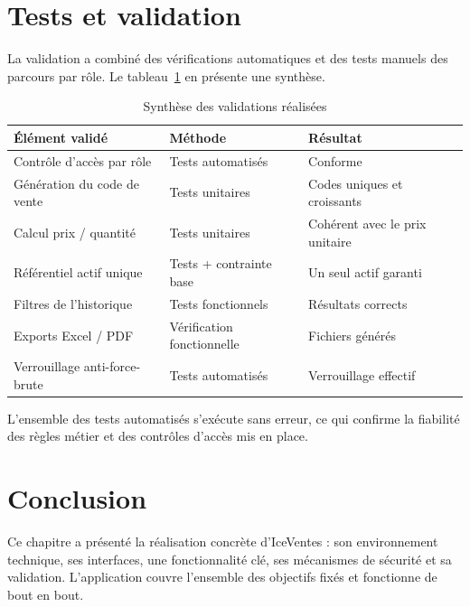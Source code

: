 \section{Tests et validation}

La validation a combiné des vérifications automatiques et des tests manuels des parcours par rôle. Le tableau~\ref{tab:validation} en présente une synthèse.

\begin{table}[H]
\centering
\caption{Synthèse des validations réalisées}
\label{tab:validation}
\begin{tabular}{@{}p{4.6cm}p{4.2cm}p{4.4cm}@{}}
\toprule
\textbf{Élément validé} & \textbf{Méthode} & \textbf{Résultat} \\
\midrule
Contrôle d'accès par rôle & Tests automatisés & Conforme \\
Génération du code de vente & Tests unitaires & Codes uniques et croissants \\
Calcul prix / quantité & Tests unitaires & Cohérent avec le prix unitaire \\
Référentiel actif unique & Tests + contrainte base & Un seul actif garanti \\
Filtres de l'historique & Tests fonctionnels & Résultats corrects \\
Exports Excel / PDF & Vérification fonctionnelle & Fichiers générés \\
Verrouillage anti-force-brute & Tests automatisés & Verrouillage effectif \\
\bottomrule
\end{tabular}
\end{table}

L'ensemble des tests automatisés s'exécute sans erreur, ce qui confirme la fiabilité des règles métier et des contrôles d'accès mis en place.

\section{Conclusion}

Ce chapitre a présenté la réalisation concrète d'IceVentes : son environnement technique, ses interfaces, une fonctionnalité clé, ses mécanismes de sécurité et sa validation. L'application couvre l'ensemble des objectifs fixés et fonctionne de bout en bout.
